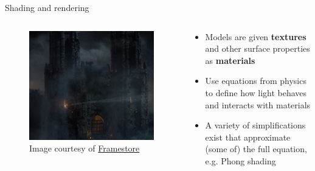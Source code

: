 \begin{frame}{Shading and rendering}
	\begin{columns}
		\begin{column}{0.3\textwidth}
			\begin{figure}
				\includegraphics[width=\textwidth]{castle_render}
				\caption*{Image courtesy of \href{https://www.framestore.com}{Framestore}}
			\end{figure}
		\end{column}
		\begin{column}{0.65\textwidth}
			\begin{itemize}
				\pause\item Models are given \textbf{textures} and other surface properties as \textbf{materials}
				\pause\item Use equations from physics to define how light behaves and interacts with materials
				\pause\item A variety of simplifications exist that approximate (some of) the full equation, e.g. Phong shading
			\end{itemize}
		\end{column}
	\end{columns}
\end{frame}
